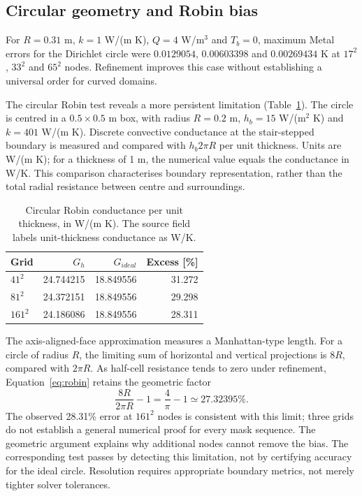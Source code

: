 \documentclass[11pt,a4paper]{article}
\begin{document}
\subsection{Circular geometry and Robin bias}
For $R=0.31$ m, $k=1$ W/(m K), $Q=4$ W/m$^3$ and $T_b=0$, maximum Metal errors for the Dirichlet circle were $0.0129054$, $0.00603398$ and $0.00269434$ K at $17^2$, $33^2$ and $65^2$ nodes. Refinement improves this case without establishing a universal order for curved domains.

The circular Robin test reveals a more persistent limitation (Table~\ref{tab:robin}). The circle is centred in a $0.5\times0.5$ m box, with radius $R=0.2$ m, $h_b=15$ W/(m$^2$ K) and $k=401$ W/(m K). Discrete convective conductance at the stair-stepped boundary is measured and compared with $h_b2\pi R$ per unit thickness. Units are W/(m K); for a thickness of 1 m, the numerical value equals the conductance in W/K. This comparison characterises boundary representation, rather than the total radial resistance between centre and surroundings.

\begin{table}[tbp]\centering\small
\caption{Circular Robin conductance per unit thickness, in W/(m K). The source field labels unit-thickness conductance as W/K.}\label{tab:robin}
\begin{tabular}{@{}lrrr@{}}\toprule
Grid & $G_h$ & $G_{ideal}$ & Excess [\%]\\\midrule
$41^2$ & 24.744215 & 18.849556 & 31.272\\
$81^2$ & 24.372151 & 18.849556 & 29.298\\
$161^2$ & 24.186086 & 18.849556 & 28.311\\
\bottomrule\end{tabular}\end{table}

The axis-aligned-face approximation measures a Manhattan-type length. For a circle of radius $R$, the limiting sum of horizontal and vertical projections is $8R$, compared with $2\pi R$. As half-cell resistance tends to zero under refinement, Equation~\eqref{eq:robin} retains the geometric factor
\begin{equation}
 \frac{8R}{2\pi R}-1=\frac4\pi-1\simeq27.32395\%.
 \label{eq:bias}
\end{equation}
The observed 28.31\% error at $161^2$ nodes is consistent with this limit; three grids do not establish a general numerical proof for every mask sequence. The geometric argument explains why additional nodes cannot remove the bias. The corresponding test passes by detecting this limitation, not by certifying accuracy for the ideal circle. Resolution requires appropriate boundary metrics, not merely tighter solver tolerances.
\end{document}
